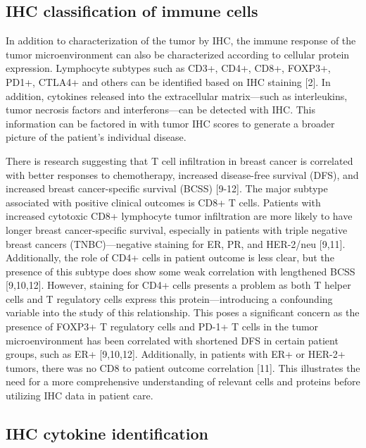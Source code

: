 \documentclass[12pt]{article}
\begin{document}
\subsection*{IHC classification of immune cells}

In addition to characterization of the tumor by IHC, the immune response of the tumor microenvironment can also be characterized according to cellular protein expression. Lymphocyte subtypes such as CD3+, CD4+, CD8+, FOXP3+, PD1+, CTLA4+ and others can be identified based on IHC staining [2]. In addition, cytokines released into the extracellular matrix---such as interleukins, tumor necrosis factors and interferons---can be detected with IHC. This information can be factored in with tumor IHC scores to generate a broader picture of the patient's individual disease.

There is research suggesting that T cell infiltration in breast cancer is correlated with better responses to chemotherapy, increased disease-free survival (DFS), and increased breast cancer-specific survival (BCSS) [9-12]. The major subtype associated with positive clinical outcomes is CD8+ T cells. Patients with increased cytotoxic CD8+ lymphocyte tumor infiltration are more likely to have longer breast cancer-specific survival, especially in patients with triple negative breast cancers (TNBC)---negative staining for ER, PR, and HER-2/neu [9,11]. Additionally, the role of CD4+ cells in patient outcome is less clear, but the presence of this subtype does show some weak correlation with lengthened BCSS [9,10,12]. However, staining for CD4+ cells presents a problem as both T helper cells and T regulatory cells express this protein---introducing a confounding variable into the study of this relationship. This poses a significant concern as the presence of FOXP3+ T regulatory cells and PD-1+ T cells in the tumor microenvironment has been correlated with shortened DFS in certain patient groups, such as ER+ [9,10,12]. Additionally, in patients with ER+ or HER-2+ tumors, there was no CD8 to patient outcome correlation [11]. This illustrates the need for a more comprehensive understanding of relevant cells and proteins before utilizing IHC data in patient care. 


\subsection*{IHC cytokine identification}
\end{document}

